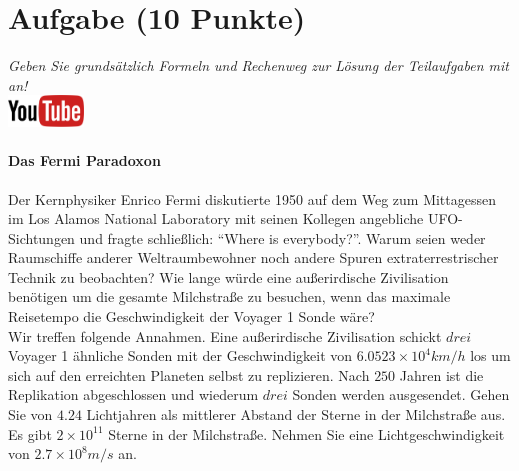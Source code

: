 \documentclass[a4paper, 10pt]{scrartcl}\usepackage[]{graphicx}\usepackage[]{xcolor}
\begin{document}
\section{Aufgabe \hfill (10 Punkte)}

\textit{Geben Sie grunds{\"a}tzlich Formeln und Rechenweg zur L{\"o}sung der
  Teilaufgaben mit an!} \\[1Ex]

\hfill\href{https://youtu.be/iCQogS6KhPM}{\includegraphics[width =
  2cm]{img/youtube}} %
\hspace{2Ex}

\paragraph{Das Fermi Paradoxon}



Der Kernphysiker Enrico Fermi diskutierte 1950 auf dem Weg zum Mittagessen
im Los Alamos National Laboratory mit seinen Kollegen angebliche
UFO-Sichtungen und fragte schlie{\ss}lich: "`Where is everybody?"'. Warum seien
weder Raumschiffe anderer Weltraumbewohner noch andere Spuren
extraterrestrischer Technik zu beobachten? Wie lange w{\"u}rde eine au{\ss}erirdische
Zivilisation ben{\"o}tigen um die gesamte Milchstra{\ss}e zu
besuchen, wenn das maximale Reisetempo die Geschwindigkeit der Voyager 1 Sonde w{\"a}re?\\[-1ex]

Wir treffen folgende Annahmen. Eine au{\ss}erirdische Zivilisation schickt $drei$
Voyager 1 {\"a}hnliche Sonden mit der Geschwindigkeit von $\ensuremath{6.0523\times 10^{4}}km/h$
los um sich auf den erreichten Planeten selbst zu replizieren. Nach
$250$ Jahren ist die Replikation abgeschlossen und wiederum
$drei$ Sonden werden ausgesendet. Gehen Sie von
$4.24$ Lichtjahren als mittlerer Abstand der Sterne in der
Milchstra{\ss}e aus. Es gibt $\ensuremath{2\times 10^{11}}$ Sterne in der Milchstra{\ss}e. Nehmen
Sie eine Lichtgeschwindigkeit von $\ensuremath{2.7\times 10^{8}}m/s$ an.
\end{document}
